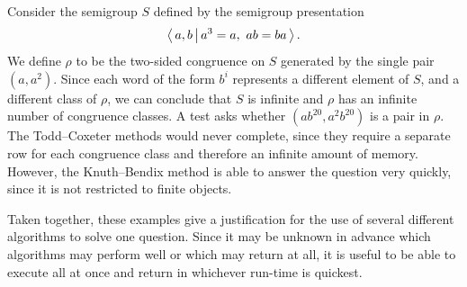 \begin{example}
  \label{ex:good-kbfp}
  Consider the semigroup $S$ defined by the semigroup presentation
  $$\left\langle \, a,b \, \middle| \, a^3=a,\ ab=ba \, \right\rangle.$$  We define $\rho$ to be the two-sided congruence on $S$
  generated by the single pair $(a, a^2)$.  Since each word of the form $b^i$
  represents a different element of $S$, and a different class of $\rho$, we can
  conclude that $S$ is infinite and $\rho$ has an infinite number of congruence
  classes.  A test asks whether $(ab^{20}, a^2b^{20})$ is a pair in $\rho$.  The
  Todd--Coxeter methods would never complete, since they require a separate row
  for each congruence class and therefore an infinite amount of memory.
  However, the Knuth--Bendix method is able to answer the question very quickly,
  since it is not restricted to finite objects.
\end{example}




Taken together, these examples give a justification for the use of several
different algorithms to solve one question.  Since it may be unknown in advance
which algorithms may perform well or which may return at all, it is useful to be
able to execute all at once and return in whichever run-time is quickest.

